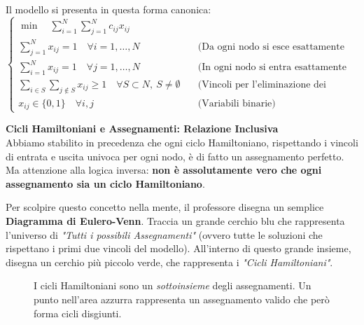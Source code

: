 \documentclass[12pt, a4paper]{article}
\begin{document}
	Il modello si presenta in questa forma canonica:
	\[
	\begin{cases}
		\min \quad \sum_{i=1}^N \sum_{j=1}^N c_{ij} x_{ij} \\[10pt]
		\sum_{j=1}^N x_{ij} = 1 \quad \forall i = 1, \dots, N \quad &\text{(Da ogni nodo si esce esattamente una volta)} \\[10pt]
		\sum_{i=1}^N x_{ij} = 1 \quad \forall j = 1, \dots, N \quad &\text{(In ogni nodo si entra esattamente una volta)} \\[10pt]
		\sum_{i \in S} \sum_{j \notin S} x_{ij} \geq 1 \quad \forall S \subset N, \ S \neq \emptyset \quad &\text{(Vincoli per l'eliminazione dei Subtours - SEC)} \\[10pt]
		x_{ij} \in \{0, 1\} \quad \forall i,j \quad &\text{(Variabili binarie)}
	\end{cases}
	\]
	
	\vspace{0.4cm}
	\textbf{Cicli Hamiltoniani e Assegnamenti: Relazione Inclusiva}\\
	Abbiamo stabilito in precedenza che ogni ciclo Hamiltoniano, rispettando i vincoli di entrata e uscita univoca per ogni nodo, è di fatto un assegnamento perfetto. Ma attenzione alla logica inversa: \textbf{non è assolutamente vero che ogni assegnamento sia un ciclo Hamiltoniano}. 
	
	Per scolpire questo concetto nella mente, il professore disegna un semplice \textbf{Diagramma di Eulero-Venn}.
	Traccia un grande cerchio blu che rappresenta l'universo di \textit{"Tutti i possibili Assegnamenti"} (ovvero tutte le soluzioni che rispettano i primi due vincoli del modello). All'interno di questo grande insieme, disegna un cerchio più piccolo verde, che rappresenta i \textit{"Cicli Hamiltoniani"}.
	
	\begin{figure}[H]
		\centering
		\caption{I cicli Hamiltoniani sono un \textit{sottoinsieme} degli assegnamenti. Un punto nell'area azzurra rappresenta un assegnamento valido che però forma cicli disgiunti.}
	\end{figure}
	
\end{document}
